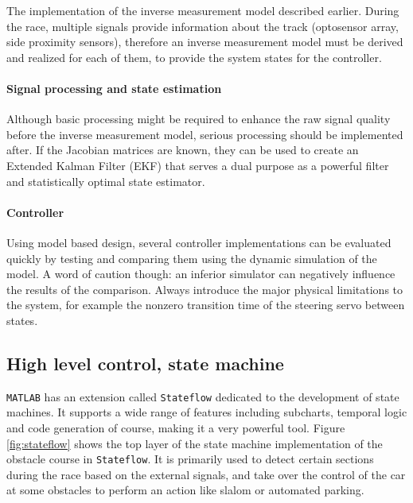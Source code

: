 The implementation of the inverse measurement model described earlier. During the race, multiple signals provide information about the track (optosensor array, side proximity sensors), therefore an inverse measurement model must be derived and realized for each of them, to provide the system states for the controller.

\paragraph{Signal processing and state estimation}

Although basic processing might be required to enhance the raw signal quality before the inverse measurement model, serious processing should be implemented after. If the Jacobian matrices are known, they can be used to create an Extended Kalman Filter (EKF) that serves a dual purpose as a powerful filter and statistically optimal state estimator.

\paragraph{Controller}

Using model based design, several controller implementations can be evaluated quickly by testing and comparing them using the dynamic simulation of the model. A word of caution though: an inferior simulator can negatively influence the results of the comparison. Always introduce the major physical limitations to the system, for example the nonzero transition time of the steering servo between states.

\subsection{High level control, state machine}

\verb!MATLAB! has an extension called \verb!Stateflow! dedicated to the development of state machines. It supports a wide range of features including subcharts, temporal logic and code generation of course, making it a very powerful tool. Figure \ref{fig:stateflow} shows the top layer of the state machine implementation of the obstacle course in \verb!Stateflow!. It is primarily used to detect certain sections during the race based on the external signals, and take over the control of the car at some obstacles to perform an action like slalom or automated parking.

